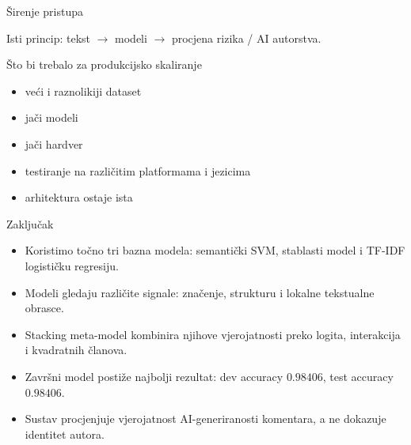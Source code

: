 \documentclass[aspectratio=169]{beamer}
\begin{document}
\begin{frame}{Širenje pristupa}
    \centering

    \vspace{4mm}
    {\small Isti princip: tekst $\rightarrow$ modeli $\rightarrow$ procjena rizika / AI autorstva.}
\end{frame}

\begin{frame}{Što bi trebalo za produkcijsko skaliranje}
    \begin{itemize}
        \item veći i raznolikiji dataset
        \item jači modeli
        \item jači hardver
        \item testiranje na različitim platformama i jezicima
        \item arhitektura ostaje ista
    \end{itemize}
\end{frame}

\begin{frame}{Zaključak}
    \begin{itemize}
        \item Koristimo točno tri bazna modela: semantički SVM, stablasti model i TF-IDF logističku regresiju.
        \item Modeli gledaju različite signale: značenje, strukturu i lokalne tekstualne obrasce.
        \item Stacking meta-model kombinira njihove vjerojatnosti preko logita, interakcija i kvadratnih članova.
        \item Završni model postiže najbolji rezultat: dev accuracy $0.98406$, test accuracy $0.98406$.
        \item Sustav procjenjuje vjerojatnost AI-generiranosti komentara, a ne dokazuje identitet autora.
    \end{itemize}
\end{frame}
\end{document}
